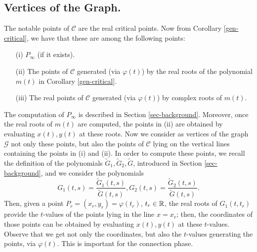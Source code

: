 \documentclass{elsart}
\begin{document}
\subsection{Vertices of the Graph.}\label{vertices}

The notable points of ${\mathcal C}$ are the real critical points.
Now from Corollary \ref{gen-critical}, we have that these are
among the following points:

\begin{itemize}
\item [(i)] $P_{\infty}$ (if it exists).
\item [(ii)] The points of ${\mathcal C}$ generated (via $\varphi(t)$) by the real roots of the polynomial $m(t)$ in Corollary \ref{gen-critical}.
    \item [(iii)] The real points of ${\mathcal C}$ generated (via $\varphi(t)$) by complex roots of $m(t)$.
    \end{itemize}

    The computation of $P_{\infty}$ is described in Section
    \ref{sec-background}. Moreover, once the real roots of
    $m(t)$ are computed, the points in (ii) are obtained by
    evaluating $x(t),y(t)$ at these roots. Now we consider as vertices of the graph ${\mathcal
    G}$ not only these points, but
    also the points of ${\mathcal C}$ lying on the vertical lines
    containing the points in (i) and (ii). In order to compute these points, we recall
    the definition of the polynomials
$\tilde{G}_1,\tilde{G}_2,\tilde{G}$, introduced in Section
\ref{sec-background}, and we consider the polynomials
\[G_1(t,s)=\displaystyle{\frac{\tilde{G}_1(t,s)}{\tilde{G}(t,s)}},
\mbox{
}G_2(t,s)=\displaystyle{\frac{\tilde{G}_2(t,s)}{\tilde{G}(t,s)}}.\]
Then, given a point $P_r=(x_r,y_r)=\varphi(t_r)$, $t_r\in {\Bbb
R}$, the real roots of $G_1(t,t_r)$ provide the $t$-values of the
points lying in the line $x=x_r$; then, the coordinates of those
points can be obtained by evaluating $x(t),y(t)$ at these
$t$-values. Observe that we get not only the coordinates, but also
the $t$-values generating the points, via $\varphi(t)$. This is
important for the connection phase.
\end{document}
